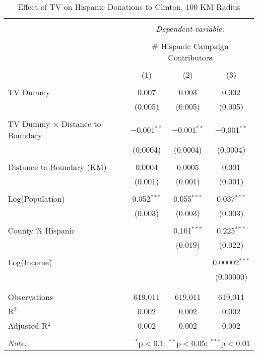 
\begin{table}[!htbp] \centering 
  \caption{Effect of TV on Hispanic Donations to Clinton, 100 KM Radius} 
  \label{} 
\begin{tabular}{@{\extracolsep{-5pt}}lccc} 
\\[-1.8ex]\hline 
\hline \\[-1.8ex] 
 & \multicolumn{3}{c}{\textit{Dependent variable:}} \\ 
\cline{2-4} 
\\[-1.8ex] & \multicolumn{3}{c}{\# Hispanic Campaign Contributors} \\ 
\\[-1.8ex] & (1) & (2) & (3)\\ 
\hline \\[-1.8ex] 
 TV Dummy & 0.007 & 0.003 & 0.002 \\ 
  & (0.005) & (0.005) & (0.005) \\ 
  & & & \\ 
 TV Dummy $\times$ Distance to Boundary  & $-$0.001$^{**}$ & $-$0.001$^{**}$ & $-$0.001$^{**}$ \\ 
  & (0.0004) & (0.0004) & (0.0004) \\ 
  & & & \\ 
 Distance to Boundary (KM) & 0.0004 & 0.0005 & 0.001 \\ 
  & (0.001) & (0.001) & (0.001) \\ 
  & & & \\ 
 Log(Population) & 0.052$^{***}$ & 0.055$^{***}$ & 0.037$^{***}$ \\ 
  & (0.003) & (0.003) & (0.003) \\ 
  & & & \\ 
 County \% Hispanic &  & 0.101$^{***}$ & 0.225$^{***}$ \\ 
  &  & (0.019) & (0.022) \\ 
  & & & \\ 
 Log(Income) &  &  & 0.00002$^{***}$ \\ 
  &  &  & (0.00000) \\ 
  & & & \\ 
\hline \\[-1.8ex] 
Observations & 619,011 & 619,011 & 619,011 \\ 
R$^{2}$ & 0.002 & 0.002 & 0.002 \\ 
Adjusted R$^{2}$ & 0.002 & 0.002 & 0.002 \\ 
\hline 
\hline \\[-1.8ex] 
\textit{Note:}  & \multicolumn{3}{r}{$^{*}$p$<$0.1; $^{**}$p$<$0.05; $^{***}$p$<$0.01} \\ 
\end{tabular} 
\end{table} 
